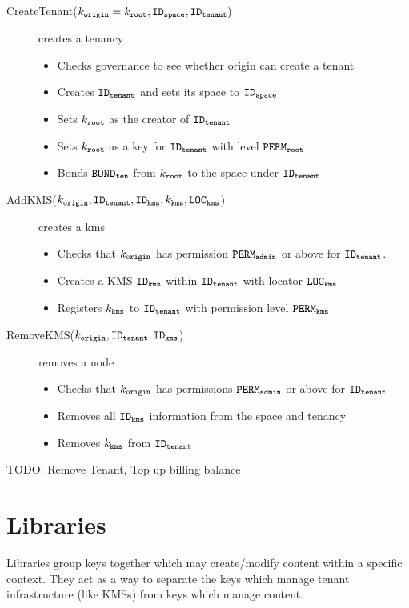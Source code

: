 \documentclass{article}
\begin{document}
\begin{description}
  \item[CreateTenant($k_\mathtt{origin} = k_\mathtt{root}, \mathtt{ID_{space}}, \mathtt{ID_{tenant}})$] creates a tenancy
    \begin{itemize}
      \item Checks governance to see whether origin can create a tenant
      \item Creates $\mathtt{ID_{tenant}}$ and sets its space to $\mathtt{ID_{space}}$
      \item Sets $k_\mathtt{root}$ as the creator of $\mathtt{ID_{tenant}}$
      \item Sets $k_\mathtt{root}$ as a key for $\mathtt{ID_{tenant}}$ with level $\mathtt{PERM_{root}}$
      \item Bonds $\mathtt{BOND_{ten}}$ from $k_\mathtt{root}$ to the space under $\mathtt{ID_{tenant}}$
    \end{itemize}
  \item[AddKMS($k_\mathtt{origin}, \mathtt{ID_{tenant}}, \mathtt{ID_{kms}}, k_\mathtt{kms}, \mathtt{LOC_{kms}}$)] creates a kms
    \begin{itemize}
      \item Checks that $k_\mathtt{origin}$ has permission $\mathtt{PERM_{admin}}$ or above for $\mathtt{ID_{tenant}}$.
      \item Creates a KMS $\mathtt{ID_{kms}}$ within $\mathtt{ID_{tenant}}$ with locator $\mathtt{LOC_{kms}}$
      \item Registers $k_\mathtt{kms}$ to $\mathtt{ID_{tenant}}$ with permission level $\mathtt{PERM_{kms}}$
    \end{itemize}
  \item[RemoveKMS($k_\mathtt{origin}, \mathtt{ID_{tenant}}, \mathtt{ID_{kms}}$)] removes a node
    \begin{itemize}
      \item Checks that $k_\mathtt{origin}$ has permissions $\mathtt{PERM_{admin}}$ or above for $\mathtt{ID_{tenant}}$
      \item Removes all $\mathtt{ID_{kms}}$ information from the space and tenancy
      \item Removes $k_\mathtt{kms}$ from $\mathtt{ID_{tenant}}$
    \end{itemize}
  \item[TODO: Remove Tenant, Top up billing balance]
\end{description}

\section{Libraries}
Libraries group keys together which may create/modify content within a specific context. 
They act as a way to separate the keys which manage tenant infrastructure (like KMSs) from keys which manage content.
\end{document}
